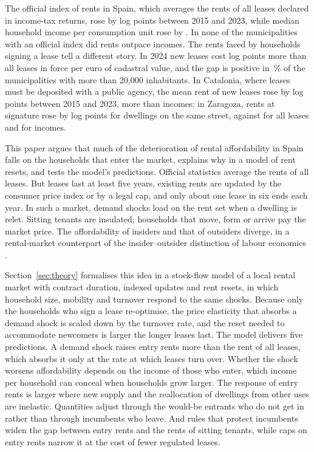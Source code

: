 \documentclass[11pt,a4paper]{article}
\begin{document}
The official index of rents in Spain, which averages the rents of all leases declared in income-tax returns, rose by \insR{} log points between 2015 and 2023, while median household income per consumption unit rose by \insY. In none of the \insN{} municipalities with an official index did rents outpace incomes. The rents faced by households signing a lease tell a different story. In 2024 new leases cost \gapVr{} log points more than all leases in force per euro of cadastral value, and the gap is positive in \gapVrShare\,\% of the \aeatN{} municipalities with more than 20,000 inhabitants. In Catalonia, where leases must be deposited with a public agency, the mean rent of new leases rose by \catR{} log points between 2015 and 2023, \catGap{} more than incomes; in Zaragoza, rents at signature rose by \zgzR{} log points for dwellings on the same street, against \zgzS{} for all leases and \zgzY{} for incomes.

This paper argues that much of the deterioration of rental affordability in Spain falls on the households that enter the market, explains why in a model of rent resets, and tests the model's predictions. Official statistics average the rents of all leases. But leases last at least five years, existing rents are updated by the consumer price index or by a legal cap, and only about one lease in six ends each year. In such a market, demand shocks load on the rent set when a dwelling is relet. Sitting tenants are insulated; households that move, form or arrive pay the market price. The affordability of insiders and that of outsiders diverge, in a rental-market counterpart of the insider--outsider distinction of labour economics \citep{lindbeck2001}.

Section~\ref{sec:theory} formalises this idea in a stock-flow model of a local rental market with contract duration, indexed updates and rent resets, in which household size, mobility and turnover respond to the same shocks. Because only the households who sign a lease re-optimise, the price elasticity that absorbs a demand shock is scaled down by the turnover rate, and the reset needed to accommodate newcomers is larger the longer leases last. The model delivers five predictions. A demand shock raises entry rents more than the rent of all leases, which absorbs it only at the rate at which leases turn over. Whether the shock worsens affordability depends on the income of those who enter, which income per household can conceal when households grow larger. The response of entry rents is larger where new supply and the reallocation of dwellings from other uses are inelastic. Quantities adjust through the would-be entrants who do not get in rather than through incumbents who leave. And rules that protect incumbents widen the gap between entry rents and the rents of sitting tenants, while caps on entry rents narrow it at the cost of fewer regulated leases.
\end{document}
